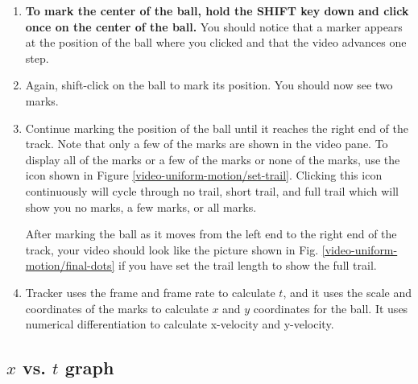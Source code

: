 \begin{enumerate}
	\item  {\bf To mark the center of the ball, hold the SHIFT key down and click once on the center of the ball.} You should notice that a marker appears at the position of the ball where you clicked and that the video advances one step.
	
	\item Again, shift-click on the ball to mark its position. You should now see two marks.
	
	\item Continue marking the position of the ball until it reaches the right end of the track. Note that only a few of the marks are shown in the video pane. To display all of the marks or a few of the marks or none of the marks, use the  icon shown in Figure \ref{video-uniform-motion/set-trail}. Clicking this icon continuously will cycle through no trail, short trail, and full trail which will show you no marks, a few marks, or all marks. 

	
	
	 After marking the ball as it moves from the left end to the right end of the track, your video should look like the picture shown in Fig. \ref{video-uniform-motion/final-dots} if you have set the trail length to show the full trail.
		
		
	\item Tracker uses the frame and frame rate to calculate $t$, and it uses the scale and coordinates of the marks to calculate $x$ and $y$ coordinates for the ball. It uses numerical differentiation to calculate x-velocity and y-velocity.
\end{enumerate}

\analysis

\subsection*{$x$ vs. $t$ graph}


